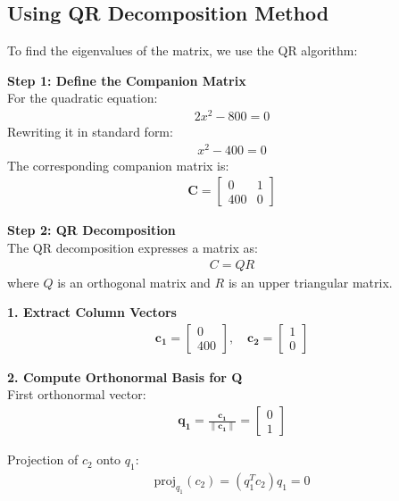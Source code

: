 \documentclass[journal]{IEEEtran}
\begin{document}
\subsection*{Using QR Decomposition Method}
To find the eigenvalues of the matrix, we use the QR algorithm:

\textbf{Step 1: Define the Companion Matrix} \\
For the quadratic equation:
\begin{align}
    2x^2 - 800 = 0
\end{align}
Rewriting it in standard form:
\begin{align}
    x^2 - 400 = 0
\end{align}
The corresponding companion matrix is:
\begin{align}
    \mathbf{C} = \begin{bmatrix} 0 & 1 \\ 400 & 0 \end{bmatrix}
\end{align}

\textbf{Step 2: QR Decomposition} \\
The QR decomposition expresses a matrix as:
\begin{align}
    C = QR
\end{align}
where \( Q \) is an orthogonal matrix and \( R \) is an upper triangular matrix.

\textbf{1. Extract Column Vectors} \\
\begin{align}
    \mathbf{c_1} = \begin{bmatrix} 0 \\ 400 \end{bmatrix}, \quad
    \mathbf{c_2} = \begin{bmatrix} 1 \\ 0 \end{bmatrix}
\end{align}

\textbf{2. Compute Orthonormal Basis for Q} \\
First orthonormal vector:
\begin{align}
    \mathbf{q_1} = \frac{\mathbf{c_1}}{\|\mathbf{c_1}\|} = \begin{bmatrix} 0 \\ 1 \end{bmatrix}
\end{align}

Projection of \( c_2 \) onto \( q_1 \):
\begin{align}
    \text{proj}_{q_1} (c_2) = (q_1^T c_2) q_1 = 0
\end{align}
\end{document}
